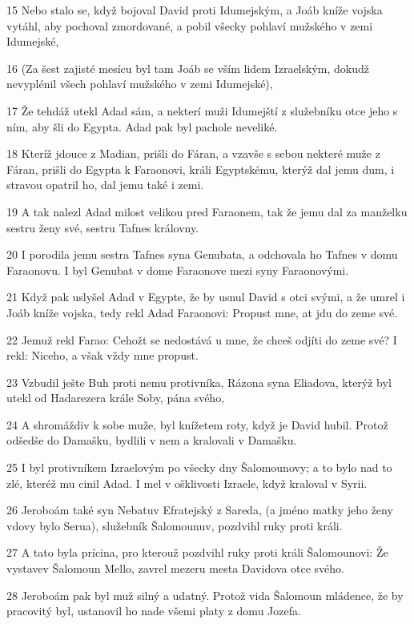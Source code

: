\par 15 Nebo stalo se, když bojoval David proti Idumejským, a Joáb kníže vojska vytáhl, aby pochoval zmordované, a pobil všecky pohlaví mužského v zemi Idumejské,
\par 16 (Za šest zajisté mesícu byl tam Joáb se vším lidem Izraelským, dokudž nevyplénil všech pohlaví mužského v zemi Idumejské),
\par 17 Že tehdáž utekl Adad sám, a nekterí muži Idumejští z služebníku otce jeho s ním, aby šli do Egypta. Adad pak byl pachole neveliké.
\par 18 Kteríž jdouce z Madian, prišli do Fáran, a vzavše s sebou nekteré muže z Fáran, prišli do Egypta k Faraonovi, králi Egyptskému, kterýž dal jemu dum, i stravou opatril ho, dal jemu také i zemi.
\par 19 A tak nalezl Adad milost velikou pred Faraonem, tak že jemu dal za manželku sestru ženy své, sestru Tafnes královny.
\par 20 I porodila jemu sestra Tafnes syna Genubata, a odchovala ho Tafnes v domu Faraonovu. I byl Genubat v dome Faraonove mezi syny Faraonovými.
\par 21 Když pak uslyšel Adad v Egypte, že by usnul David s otci svými, a že umrel i Joáb kníže vojska, tedy rekl Adad Faraonovi: Propust mne, at jdu do zeme své.
\par 22 Jemuž rekl Farao: Cehožt se nedostává u mne, že chceš odjíti do zeme své? I rekl: Niceho, a však vždy mne propust.
\par 23 Vzbudil ješte Buh proti nemu protivníka, Rázona syna Eliadova, kterýž byl utekl od Hadarezera krále Soby, pána svého,
\par 24 A shromáždiv k sobe muže, byl knížetem roty, když je David hubil. Protož odšedše do Damašku, bydlili v nem a kralovali v Damašku.
\par 25 I byl protivníkem Izraelovým po všecky dny Šalomounovy; a to bylo nad to zlé, kteréž mu cinil Adad. I mel v ošklivosti Izraele, když kraloval v Syrii.
\par 26 Jeroboám také syn Nebatuv Efratejský z Sareda, (a jméno matky jeho ženy vdovy bylo Serua), služebník Šalomounuv, pozdvihl ruky proti králi.
\par 27 A tato byla prícina, pro kterouž pozdvihl ruky proti králi Šalomounovi: Že vystavev Šalomoun Mello, zavrel mezeru mesta Davidova otce svého.
\par 28 Jeroboám pak byl muž silný a udatný. Protož vida Šalomoun mládence, že by pracovitý byl, ustanovil ho nade všemi platy z domu Jozefa.
